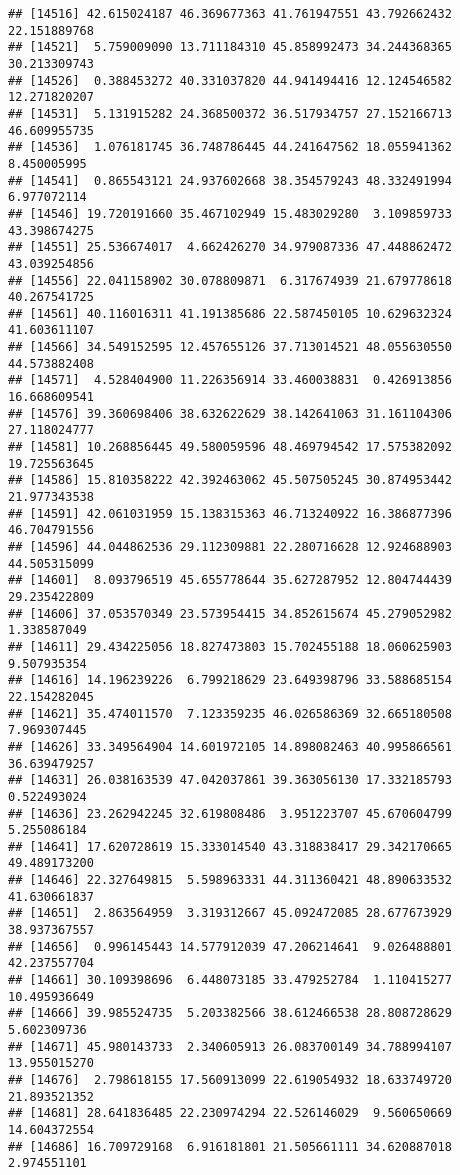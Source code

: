 \documentclass[
]{article}
\begin{document}
\begin{verbatim}
## [14516] 42.615024187 46.369677363 41.761947551 43.792662432 22.151889768
## [14521]  5.759009090 13.711184310 45.858992473 34.244368365 30.213309743
## [14526]  0.388453272 40.331037820 44.941494416 12.124546582 12.271820207
## [14531]  5.131915282 24.368500372 36.517934757 27.152166713 46.609955735
## [14536]  1.076181745 36.748786445 44.241647562 18.055941362  8.450005995
## [14541]  0.865543121 24.937602668 38.354579243 48.332491994  6.977072114
## [14546] 19.720191660 35.467102949 15.483029280  3.109859733 43.398674275
## [14551] 25.536674017  4.662426270 34.979087336 47.448862472 43.039254856
## [14556] 22.041158902 30.078809871  6.317674939 21.679778618 40.267541725
## [14561] 40.116016311 41.191385686 22.587450105 10.629632324 41.603611107
## [14566] 34.549152595 12.457655126 37.713014521 48.055630550 44.573882408
## [14571]  4.528404900 11.226356914 33.460038831  0.426913856 16.668609541
## [14576] 39.360698406 38.632622629 38.142641063 31.161104306 27.118024777
## [14581] 10.268856445 49.580059596 48.469794542 17.575382092 19.725563645
## [14586] 15.810358222 42.392463062 45.507505245 30.874953442 21.977343538
## [14591] 42.061031959 15.138315363 46.713240922 16.386877396 46.704791556
## [14596] 44.044862536 29.112309881 22.280716628 12.924688903 44.505315099
## [14601]  8.093796519 45.655778644 35.627287952 12.804744439 29.235422809
## [14606] 37.053570349 23.573954415 34.852615674 45.279052982  1.338587049
## [14611] 29.434225056 18.827473803 15.702455188 18.060625903  9.507935354
## [14616] 14.196239226  6.799218629 23.649398796 33.588685154 22.154282045
## [14621] 35.474011570  7.123359235 46.026586369 32.665180508  7.969307445
## [14626] 33.349564904 14.601972105 14.898082463 40.995866561 36.639479257
## [14631] 26.038163539 47.042037861 39.363056130 17.332185793  0.522493024
## [14636] 23.262942245 32.619808486  3.951223707 45.670604799  5.255086184
## [14641] 17.620728619 15.333014540 43.318838417 29.342170665 49.489173200
## [14646] 22.327649815  5.598963331 44.311360421 48.890633532 41.630661837
## [14651]  2.863564959  3.319312667 45.092472085 28.677673929 38.937367557
## [14656]  0.996145443 14.577912039 47.206214641  9.026488801 42.237557704
## [14661] 30.109398696  6.448073185 33.479252784  1.110415277 10.495936649
## [14666] 39.985524735  5.203382566 38.612466538 28.808728629  5.602309736
## [14671] 45.980143733  2.340605913 26.083700149 34.788994107 13.955015270
## [14676]  2.798618155 17.560913099 22.619054932 18.633749720 21.893521352
## [14681] 28.641836485 22.230974294 22.526146029  9.560650669 14.604372554
## [14686] 16.709729168  6.916181801 21.505661111 34.620887018  2.974551101

\end{verbatim}
\end{document}
